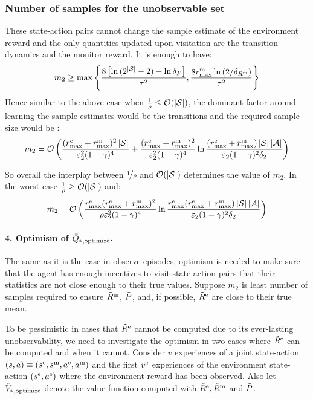 \subsubsection*{Number of samples for the unobservable set}
These state-action pairs cannot change the sample estimate of the environment reward and the only quantities updated upon visitation are the transition dynamics and the monitor reward. It is enough to have:
%
\begin{equation*}
    m_2 \geq \max \left\{\frac{8\left[\ln{(2^{|\mathcal{S}|} - 2)} - \ln{\delta_P}\right]}{\tau^2}, \frac{8r_{\text{max}}^\text{m}\ln{(2/\delta_{R^\text{m}})}}{\tau^2}\right\}
\end{equation*}
%
Hence similar to the above case when $\frac{1}{\rho} \leq \mathcal{O}(\left \lvert \mathcal{S} \right \rvert)$, the dominant factor around learning the sample estimates would be the transitions and the required sample size would be :
\begin{equation}
    m_2 = \mathcal{O}\left(\frac{(r_{\text{max}}^\text{e} + r_{\text{max}}^\text{m})^2\left \lvert \mathcal{S} \right \rvert}{\varepsilon_2^2(1 - \gamma)^4} + \frac{(r_{\text{max}}^\text{e} + r_{\text{max}}^\text{m})^2}{\varepsilon_2^2(1 - \gamma)^4}\ln{\frac{(r_{\text{max}}^\text{e} + r_{\text{max}}^\text{m})\left \lvert \mathcal{S} \right \rvert \left \lvert \mathcal{A} \right \rvert}{\varepsilon_2(1 - \gamma)^2\delta_2}}\right)
\end{equation}

So overall the interplay between $\nicefrac 1\rho$ and $\mathcal{O}(\left \lvert \mathcal{S} \right \rvert)$ determines the value of $m_2$. In the worst case $\frac{1}{\rho} \geq \mathcal{O}(\left \lvert \mathcal{S} \right \rvert)$ and:
%
\begin{equation}
m_2 = \mathcal{O}\left(\frac{r_{\text{max}}^\text{e} (r_{\text{max}}^\text{e} + r_{\text{max}}^\text{m})^2}{\rho \varepsilon_2^2(1 - \gamma)^4} \ln{\frac{r_{\text{max}}^\text{e}(r_{\text{max}}^\text{e} + r_{\text{max}}^\text{m})\left \lvert \mathcal{S} \right \rvert\left \lvert \mathcal{A} \right \rvert}{\varepsilon_2(1 - \gamma)^2\delta_2}}\right)
\end{equation}
%
\paragraph{4. Optimism of $\bar{Q}_{*, \text{optimize}}$.} The same as it is the case in observe episodes, optimism is needed to make sure that the agent has enough incentives to visit state-action pairs that their statistics are not close enough to their true values.  Suppose $m_2$ is least number of samples required to ensure $\tilde{R}^\text{m}$, $\tilde{P}$, and, if possible, $\tilde{R}^\text{e}$ are close to their true mean.

To be pessimistic in cases that $\tilde{R}^\text{e}$ cannot be computed due to its ever-lasting unobservability, we need to investigate the optimism in two cases where $\tilde{R}^\text{e}$ can be computed and when it cannot. Consider $v$ experiences of a joint state-action $(s, a) \equiv (s^\text{e}, s^\text{m}, a^\text{e}, a^\text{m})$ and the first $v^\text{e}$ experiences of the environment state-action $(s^\text{e}, a^\text{e})$ where the environment reward has been observed. Also let $\tilde{V}_{*, \text{optimize}}$ denote the value function computed with $\tilde{R}^\text{e}, \tilde{R}^\text{m}$ and ${\tilde{P}}$.
%

